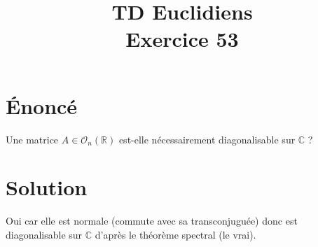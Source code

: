 \documentclass[french]{article}
\title{TD Euclidiens\\ Exercice 53}
\date{}
\newcommand{\R}{\mathbb{R}}
\newcommand{\C}{\mathbb{C}}
\begin{document}
\maketitle

\section{Énoncé}
Une matrice $A\in\mathcal{O}_n(\R)$ est-elle nécessairement diagonalisable sur $\C$ ?
\section{Solution}
Oui car elle est normale (commute avec sa transconjuguée) donc est diagonalisable sur $\C$ d'après le théorème spectral (le vrai).
\end{document}
